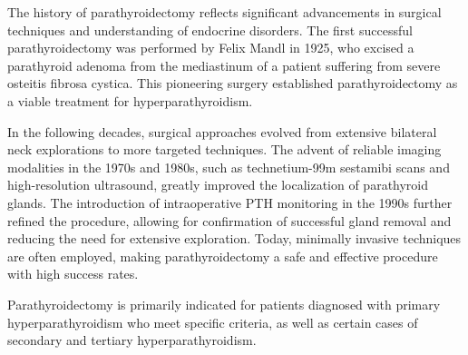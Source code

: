 The history of parathyroidectomy reflects significant advancements in surgical techniques and understanding of endocrine disorders. The first successful parathyroidectomy was performed by Felix Mandl in 1925, who excised a parathyroid adenoma from the mediastinum of a patient suffering from severe osteitis fibrosa cystica. This pioneering surgery established parathyroidectomy as a viable treatment for hyperparathyroidism.

In the following decades, surgical approaches evolved from extensive bilateral neck explorations to more targeted techniques. The advent of reliable imaging modalities in the 1970s and 1980s, such as technetium-99m sestamibi scans and high-resolution ultrasound, greatly improved the localization of parathyroid glands. The introduction of intraoperative PTH monitoring in the 1990s further refined the procedure, allowing for confirmation of successful gland removal and reducing the need for extensive exploration. Today, minimally invasive techniques are often employed, making parathyroidectomy a safe and effective procedure with high success rates.

Parathyroidectomy is primarily indicated for patients diagnosed with primary hyperparathyroidism who meet specific criteria, as well as certain cases of secondary and tertiary hyperparathyroidism.

